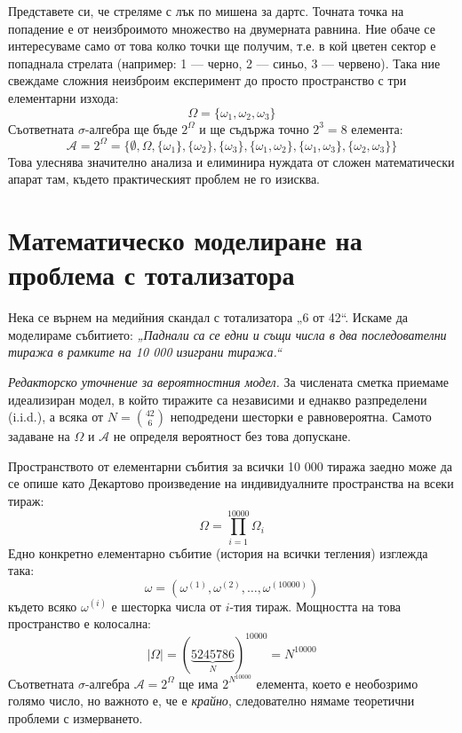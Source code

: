 \begin{example}\label{ex:01-13}
Представете си, че стреляме с лък по мишена за дартс. Точната точка на попадение е от неизброимото множество на двумерната равнина. Ние обаче се интересуваме само от това колко точки ще получим, т.е. в кой цветен сектор е попаднала стрелата (например: 1 — черно, 2 — синьо, 3 — червено). Така ние свеждаме сложния неизброим експеримент до просто пространство с три елементарни изхода:
\[
\Omega = \{\omega_1, \omega_2, \omega_3\}
\]
Съответната $\sigma$-алгебра ще бъде $2^\Omega$ и ще съдържа точно $2^3 = 8$ елемента:
\[
\mathcal{A} = 2^\Omega = \{\emptyset, \Omega, \{\omega_1\}, \{\omega_2\}, \{\omega_3\}, \{\omega_1, \omega_2\}, \{\omega_1, \omega_3\}, \{\omega_2, \omega_3\}\}
\]
Това улеснява значително анализа и елиминира нуждата от сложен математически апарат там, където практическият проблем не го изисква.
\end{example}

\section{Математическо моделиране на проблема с тотализатора}

Нека се върнем на медийния скандал с тотализатора „6 от 42“. Искаме да моделираме събитието: \emph{„Паднали са се едни и същи числа в два последователни тиража в рамките на 10 000 изиграни тиража.“}

\emph{Редакторско уточнение за вероятностния модел.} За числената сметка приемаме идеализиран модел, в който тиражите са независими и еднакво разпределени (i.i.d.), а всяка от $N=\binom{42}{6}$ неподредени шесторки е равновероятна. Самото задаване на $\Omega$ и $\mathcal{A}$ не определя вероятност без това допускане.

Пространството от елементарни събития за всички 10 000 тиража заедно може да се опише като Декартово произведение на индивидуалните пространства на всеки тираж:
\[
\Omega = \prod_{i=1}^{10000} \Omega_i
\]
Едно конкретно елементарно събитие (история на всички тегления) изглежда така:
\[
\omega = (\omega^{(1)}, \omega^{(2)}, \dots, \omega^{(10000)})
\]
където всяко $\omega^{(i)}$ е шесторка числа от $i$-тия тираж.
Мощността на това пространство е колосална:
\[
|\Omega| = (\underbrace{5245786}_{N})^{10000} = N^{10000}
\]
Съответната $\sigma$-алгебра $\mathcal{A} = 2^\Omega$ ще има $2^{N^{10000}}$ елемента, което е необозримо голямо число, но важното е, че е \emph{крайно}, следователно нямаме теоретични проблеми с измерването.


